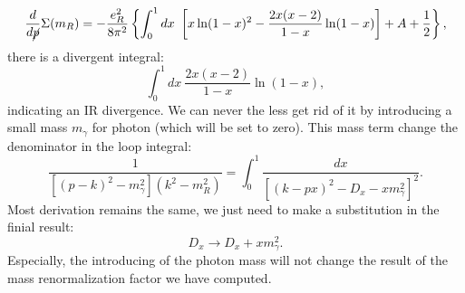 \begin{equation}
	\frac{d}{d \cancel p}\Sigma(m_R)  
	= -\frac{e_R^2}{8\pi^2} \left\{\int_0^1 dx\ \left[ x\ln(1-x)^2 -\frac{2x(x-2)}{1-x}\ln(1-x)\right] + A + \frac{1}{2}\right\},
\end{equation}
there is a divergent integral:
\begin{equation}
	\int_0^1 dx\ \frac{2x(x-2)}{1-x}\ln(1-x),
\end{equation}
indicating an IR divergence.
We can never the less get rid of it by introducing a small mass $m_\gamma$ for photon (which will be set to zero).
This mass term change the denominator in the loop integral:
\begin{equation}
	\frac{1}{\left[(p-k)^2-m_\gamma^2\right](k^2-m_R^2)} 
	= \int_0^1 \frac{dx}{\left[(k-px)^2-D_x -x m_\gamma^2\right]^2}.
\end{equation}
Most derivation remains the same, we just need to make a substitution in the finial result:
\begin{equation}
	D_x \rightarrow D_x + x m_\gamma^2.
\end{equation}
Especially, the introducing of the photon mass will not change the result of the mass renormalization factor we have computed.


